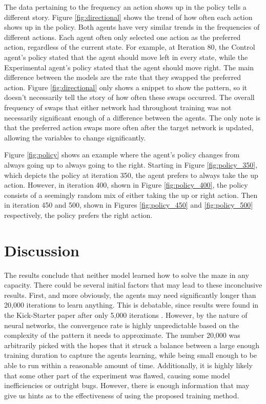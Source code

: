 \documentclass[12pt,letterpaper]{article}
\begin{document}
The data pertaining to the frequency an action shows up in the policy tells a different story.
Figure \ref{fig:directional} shows the trend of how often each action shows up in the policy.
Both agents have very similar trends in the frequencies of different actions.
Each agent often only selected one action as the preferred action, regardless of the current state.
For example, at Iteration 80, the Control agent's policy stated that the agent should move left in every state, while the Experimental agent's policy stated that the agent should move right.
The main difference between the models are the rate that they swapped the preferred action.
Figure \ref{fig:directional} only shows a snippet to show the pattern, so it doesn't necessarily tell the story of how often these swaps occurred.
The overall frequency of swaps that either network had throughout training was not necessarily significant enough of a difference between the agents.
The only note is that the preferred action swaps more often after the target network is updated, allowing the variables to change significantly.

Figure \ref{fig:policy} shows an example where the agent's policy changes from always going up to always going to the right.
Starting in Figure \ref{fig:policy_350}, which depicts the policy at iteration 350, the agent prefers to always take the up action.
However, in iteration 400, shown in Figure \ref{fig:policy_400}, the policy consists of a seemingly random mix of either taking the up or right action.
Then in iteration 450 and 500, shown in Figures \ref{fig:policy_450} and \ref{fig:policy_500} respectively, the policy prefers the right action.

\section{Discussion}

The results conclude that neither model learned how to solve the maze in any capacity.
There could be several initial factors that may lead to these inconclusive results.
First, and more obviously, the agents may need significantly longer than 20,000 iterations to learn anything.
This is debatable, since results were found in the Kick-Starter paper after only 5,000 iterations \cite{article_kickstart_deep_reinforcement_learning}.
However, by the nature of neural networks, the convergence rate is highly unpredictable based on the complexity of the pattern it needs to approximate.
The number 20,000 was arbitrarily picked with the hopes that it struck a balance between a large enough training duration to capture the agents learning, while being small enough to be able to run within a reasonable amount of time.
Additionally, it is highly likely that some other part of the experiment was flawed, causing some model inefficiencies or outright bugs.
However, there is enough information that may give us hints as to the effectiveness of using the proposed training method.
\end{document}
